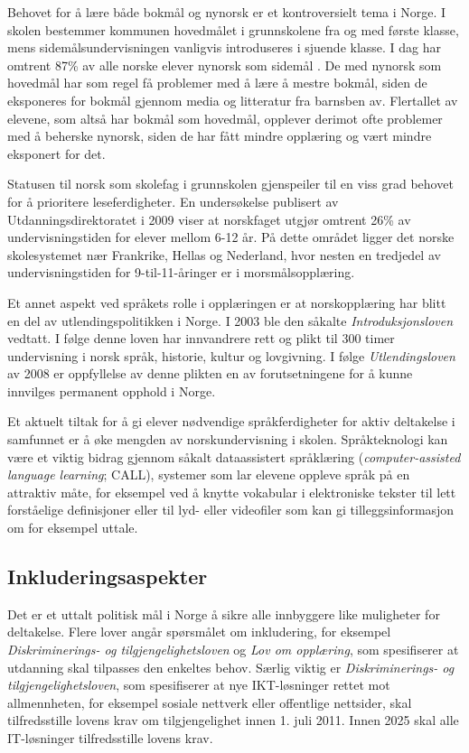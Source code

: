 \begin{multicols}{2}
Behovet for å lære både bokmål og nynorsk er et kontroversielt tema i Norge. I skolen bestemmer kommunen hovedmålet i grunnskolene fra og med første klasse, mens sidemålsundervisningen vanligvis introduseres i sjuende klasse. I dag har omtrent 87\% av alle norske elever nynorsk som sidemål \cite{SR:2010}.
De med nynorsk som hovedmål har som regel få problemer med å lære å mestre bokmål, siden de eksponeres for bokmål gjennom media og litteratur fra barnsben av. Flertallet av elevene, som altså har bokmål som hovedmål, opplever derimot ofte problemer med å beherske nynorsk, siden de har fått mindre opplæring og vært mindre eksponert for det. 

Statusen til norsk som skolefag i grunnskolen gjenspeiler til en viss grad behovet for å prioritere leseferdigheter. En undersøkelse publisert av Utdanningsdirektoratet i 2009 viser at norskfaget utgjør omtrent 26\% av undervisningstiden for elever mellom 6-12 år. 
På dette området ligger det norske skolesystemet nær Frankrike, Hellas og Nederland, hvor nesten en tredjedel av undervisningstiden for 9-til-11-åringer er i morsmålsopplæring. 

Et annet aspekt ved språkets rolle i opplæringen er at norskopplæring har blitt en del av utlendingspolitikken i Norge.
I 2003 ble den såkalte \textit{Introduksjonsloven} vedtatt. I følge denne loven har innvandrere rett og plikt til 300 timer undervisning i norsk språk, historie, kultur og lovgivning. 
I følge \textit{Utlendingsloven} av 2008 er oppfyllelse av denne plikten en av forutsetningene for å kunne innvilges permanent opphold i Norge. 

Et aktuelt tiltak for å gi elever nødvendige språkferdigheter for aktiv deltakelse i samfunnet er å øke mengden av norskundervisning i skolen. 
Språkteknologi kan være et viktig bidrag gjennom såkalt dataassistert språklæring (\textit{computer-assisted language learning}; CALL), systemer som lar elevene oppleve språk på en attraktiv måte, for eksempel ved å knytte vokabular i elektroniske tekster til lett forståelige definisjoner eller til lyd- eller  videofiler som kan gi tilleggsinformasjon om for eksempel uttale.

\subsection{Inkluderingsaspekter} 

Det er et uttalt politisk mål i Norge å sikre alle innbyggere like muligheter for deltakelse. 
Flere lover angår spørsmålet om inkludering, for eksempel \textit{Diskriminerings- og tilgjengelighetsloven} og \textit{Lov om opplæring}, som spesifiserer at utdanning skal tilpasses den enkeltes behov. 
Særlig viktig er \textit{Diskriminerings- og tilgjengelighetsloven}, som spesifiserer at nye IKT-løsninger rettet mot allmennheten, for eksempel sosiale nettverk eller offentlige nettsider, skal tilfredsstille lovens krav om tilgjengelighet innen 1. juli 2011. 
Innen 2025 skal alle IT-løsninger tilfredsstille lovens krav.


\end{multicols}
